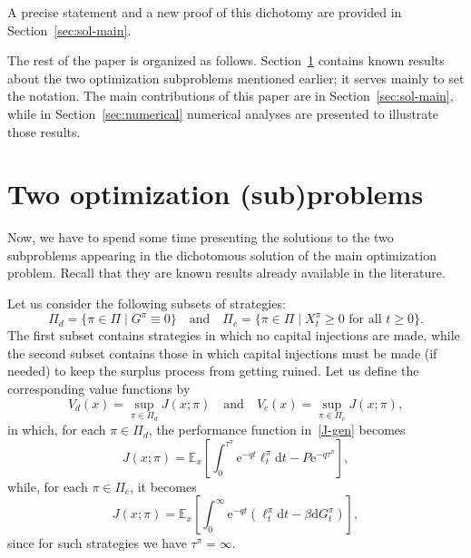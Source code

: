 \documentclass[11pt,reqno]{amsart}
\newcommand{\E}{\mathbb{E}}
\newcommand{\e}{\mathrm{e}}
\newcommand{\diff}{\mathrm{d}}
\renewcommand{\geq}{\geqslant}
\begin{document}
A precise statement and a new proof of this dichotomy are provided in Section~\ref{sec:sol-main}.

The rest of the paper is organized as follows. Section~\ref{sec:sub-problems} contains known results about the two optimization subproblems mentioned earlier; it serves mainly to set the notation. The main contributions of this paper are in Section~\ref{sec:sol-main}, while in Section~\ref{sec:numerical} numerical analyses are presented to illustrate those results.


\section{Two optimization (sub)problems}\label{sec:sub-problems}

Now, we have to spend some time presenting the solutions to the two subproblems appearing in the dichotomous solution of the main optimization problem. Recall that they are known results already available in the literature. 


Let us consider the following subsets of strategies:
\begin{equation}
    \Pi_d = \{\pi\in\Pi \mid G^\pi \equiv 0\} \quad \text{and} \quad \Pi_c = \{\pi\in\Pi \mid X^\pi_t \geq 0 \text{ for all } t\geq 0\} .
\end{equation}
The first subset contains strategies in which no capital injections are made, while the second subset contains those in which capital injections must be made (if needed) to keep the surplus process from getting ruined. Let us define the corresponding value functions by
\begin{equation}
    V_d(x) = \sup_{\pi\in\Pi_d} J(x;\pi) \quad \text{and} \quad V_c(x) = \sup_{\pi\in\Pi_c}J(x;\pi) ,
\end{equation}
in which, for each $\pi\in\Pi_d$, the performance function in~\eqref{J-gen} becomes
\begin{equation}
    J(x;\pi) = \E_x\left[\int_0^{\tau^\pi}\e^{-qt}\ell^\pi_t \diff t - P\e^{-q\tau^\pi} \right] ,
\end{equation}
while, for each $\pi\in\Pi_c$, it becomes
\begin{equation}
    J(x;\pi) = \E_x\left[\int_0^\infty \e^{-qt}\left(\ell^\pi_t \diff t - \beta\diff G^\pi_t\right)\right] ,
\end{equation}
since for such strategies we have $\tau^\pi = \infty$.
\end{document}
